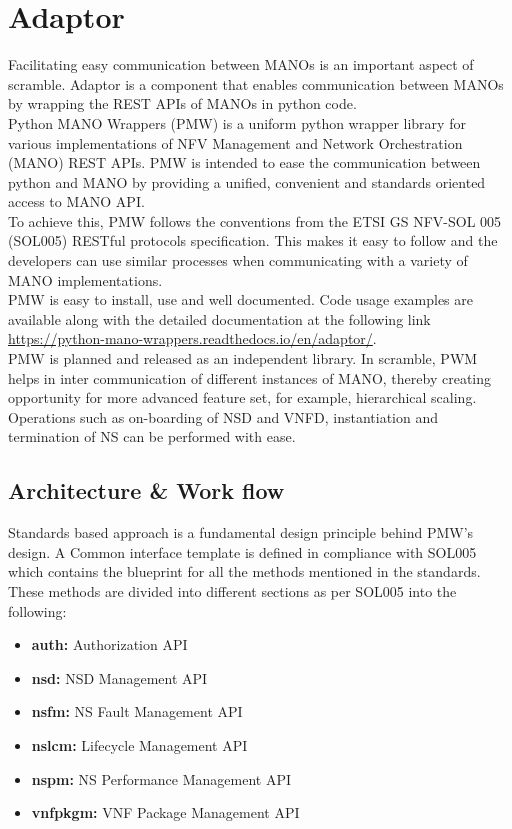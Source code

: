 \section{Adaptor}

Facilitating easy communication between MANOs is an important aspect of scramble. 
Adaptor is a component that enables communication between MANOs by wrapping the REST APIs of MANOs in python code.\\

Python MANO Wrappers (PMW) is a uniform python wrapper library for various implementations of NFV Management and Network Orchestration (MANO) REST APIs. 
PMW is intended to ease the communication between python and MANO by providing a unified, convenient and standards oriented access to MANO API.\\

To achieve this, PMW follows the conventions from the ETSI GS NFV-SOL 005 (SOL005) RESTful protocols specification. 
This makes it easy to follow and the developers can use similar processes when communicating with a variety of MANO implementations.\\

PMW is easy to install, use and well documented. 
Code usage examples are available along with the detailed documentation at the following link \url{https://python-mano-wrappers.readthedocs.io/en/adaptor/}. \\

PMW is planned and released as an independent library. 
In scramble, PWM helps in inter communication of different instances of MANO, thereby creating opportunity for more advanced feature set, for example, hierarchical scaling. 
Operations such as on-boarding of NSD and VNFD, instantiation and termination of NS can be performed with ease.

\subsection{Architecture \& Work flow}
Standards based approach is a fundamental design principle behind PMW's design. 
A Common interface template is defined in compliance with SOL005 which contains the blueprint for all the methods mentioned in the standards. 
These methods are divided into different sections as per SOL005 into the following:

\begin{itemize}
	\item \textbf{auth: }Authorization API
	\item \textbf{nsd: }NSD Management API
	\item \textbf{nsfm: }NS Fault Management API
	\item \textbf{nslcm: }Lifecycle Management API
	\item \textbf{nspm: }NS Performance Management API
	\item \textbf{vnfpkgm: }VNF Package Management API
\end{itemize} 

